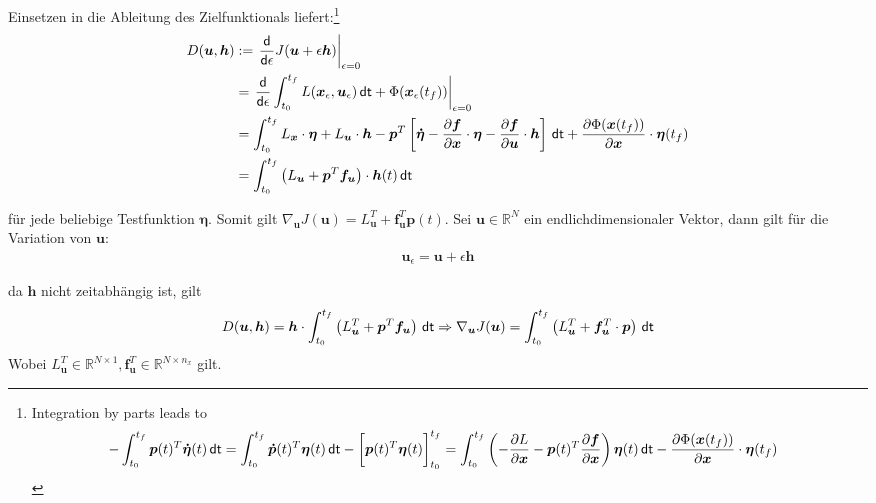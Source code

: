 \documentclass[a4paper, 12pt]{scrartcl}
\newcommand{\dt}{\thinspace \mathsf{dt}}
\begin{document}
Einsetzen in die Ableitung des Zielfunktionals liefert:\footnote{
    Integration by parts leads to
    \begin{align*}
        - \int_{t_0}^{t_f} \bm{p}(t)^T \bm{\dot{\eta}}(t) \dt
        &=
        \int_{t_0}^{t_f} \bm{\dot{p}}(t)^T \bm{\eta}(t) \dt 
        -
        \left[
            \vphantom{\int}
            \bm{p}(t)^T \bm{\eta}(t)
        \right]_{t_0}^{t_f}
        =
        \int_{t_0}^{t_f} 
        \left(
            - \frac{\partial L}{\partial \bm{x}} 
            - 
            \bm{p}(t)^T \frac{\partial \bm{f}}{\partial \bm{x}}
        \right)  
        \bm{\eta}(t) \dt 
        -
        \frac{\partial \Phi(\bm{x}(t_f))}{\partial \bm{x}} \cdot \bm{\eta}(t_f)
    \end{align*}
}
%
\begin{align*}
    D(\bm{u},\bm{h})
    &:=
    \left. 
        \frac{\mathsf{d}}{\mathsf{d}\epsilon} 
        J(\bm{u} + \epsilon \bm{h}) 
    \right|_{\epsilon=0} 
    \\
    &= 
    \left.
        \frac{\mathsf{d}}{\mathsf{d}\epsilon} 
        \int_{t_0}^{t_f} L(\bm{x}_\epsilon, \bm{u}_\epsilon) \dt + \Phi(\bm{x}_\epsilon(t_f))
    \right|_{\epsilon=0}
    \\
    &=
    \int_{t_0}^{t_f} 
    L_{\bm{x}} \cdot \bm{\eta}
    + 
    L_{\bm{u}} \cdot \bm{h}
    - 
    \bm{p}^T
    \left[
        \bm{\dot{\eta}} 
        -
        \frac{\partial \bm{f}}{\partial \bm{x}} \cdot \bm{\eta}
        -
        \frac{\partial \bm{f}}{\partial \bm{u}} \cdot \bm{h}
    \right]
    \dt 
    + \frac{\partial \Phi(\bm{x}(t_f))}{\partial \bm{x}} \cdot \bm{\eta}(t_f)
    \\
    &=
    \int_{t_0}^{t_f} 
    \left(
        L_{\bm{u}} + \bm{p}^T \bm{f}_{\bm{u}} 
    \right)
    \cdot \bm{h}(t)
    \dt 
\end{align*}

für jede beliebige Testfunktion $\bm{\eta}$. Somit gilt 
$\nabla_{\bm{u}} J(\bm{u}) = L_{\bm{u}}^T + \bm{f}_{\bm{u}}^T \bm{p}(t)$. 
Sei $\bm{u}\in \mathbb{R}^N$ ein endlichdimensionaler Vektor, dann gilt für die Variation von $\bm{u}$:
%
\begin{align*}
    \bm{u}_\epsilon = \bm{u} + \epsilon \bm{h} 
\end{align*}

da $\bm{h}$ nicht zeitabhängig ist, gilt 
\begin{align}
    D(\bm{u},\bm{h})
    =
    \bm{h} \cdot
    \int_{t_0}^{t_f} 
    \left(
        L_{\bm{u}}^T + \bm{p}^T \bm{f}_{\bm{u}} 
    \right)
    \dt 
    \Rightarrow
    \nabla_{\bm{u}} J(\bm{u}) =
    \int_{t_0}^{t_f} 
    \left(
        L_{\bm{u}}^T
        +
        \bm{f}_{\bm{u}}^T \cdot \bm{p}
    \right)
    \dt
    \label{eq:optimal_condition_Vector_case}
\end{align}
%
Wobei $L_{\bm{u}}^T \in \mathbb{R}^{N \times 1}, \bm{f}_{\bm{u}}^T \in \mathbb{R}^{N \times n_x}$ gilt.
\end{document}
